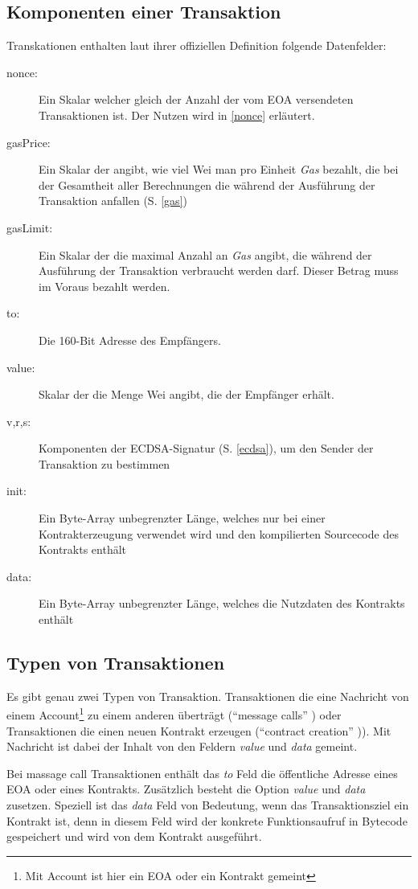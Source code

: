 \documentclass[runningheads]{llncs}
\begin{document}
\subsection{Komponenten einer Transaktion}
Transkationen enthalten laut ihrer offiziellen Definition \cite[S. 4]{wood_ethereum/yellowpaper_2019} folgende Datenfelder:
\begin{description}
  \item[nonce:] Ein Skalar welcher gleich der Anzahl der vom EOA versendeten Transaktionen ist. Der Nutzen wird in \ref{nonce} erläutert.
  \item[gasPrice:] Ein Skalar der angibt, wie viel Wei man pro Einheit \textit{Gas} bezahlt, die bei der Gesamtheit aller Berechnungen die während der Ausführung der Transaktion anfallen (S. \ref{gas})
  \item[gasLimit:] Ein Skalar der die maximal Anzahl an \textit{Gas} angibt, die während der Ausführung der Transaktion verbraucht werden darf. Dieser Betrag muss im Voraus bezahlt werden.
  \item[to:] Die 160-Bit Adresse des Empfängers.
  \item[value:] Skalar der die Menge Wei angibt, die der Empfänger erhält.
  \item[v,r,s:] Komponenten der ECDSA-Signatur (S. \ref{ecdsa}), um den Sender der Transaktion zu bestimmen
  \item[init:] Ein Byte-Array unbegrenzter Länge, welches nur bei einer Kontrakterzeugung verwendet wird und den kompilierten Sourcecode des Kontrakts enthält
  \item[data:] Ein Byte-Array unbegrenzter Länge, welches die Nutzdaten des Kontrakts enthält
\end{description}


\subsection{Typen von Transaktionen}
Es gibt genau zwei Typen von Transaktion. Transaktionen die eine Nachricht von einem Account\footnote{Mit Account ist hier ein EOA oder ein Kontrakt gemeint} zu einem anderen überträgt ("`message calls"' \cite[S. 4]{wood_ethereum/yellowpaper_2019}) oder Transaktionen die einen neuen Kontrakt erzeugen ("`contract creation"' \cite[S. 4]{wood_ethereum/yellowpaper_2019})). Mit Nachricht ist dabei der Inhalt von den Feldern \textit{value} und \textit{data} gemeint.

Bei massage call Transaktionen enthält das \textit{to} Feld die öffentliche Adresse eines EOA oder eines Kontrakts. Zusätzlich besteht die Option \textit{value} und \textit{data} zusetzen. Speziell ist das \textit{data} Feld von Bedeutung, wenn das Transaktionsziel ein Kontrakt ist, denn in diesem Feld wird der konkrete
Funktionsaufruf in Bytecode gespeichert und wird von dem Kontrakt ausgeführt.
\end{document}

